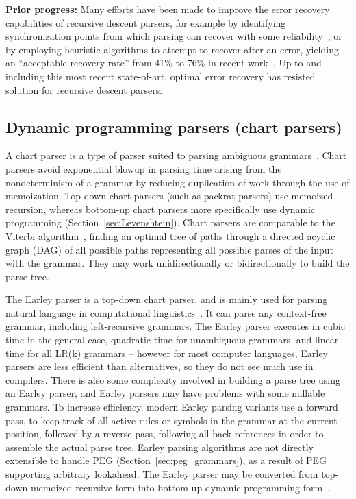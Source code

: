 \documentclass[manuscript,screen]{acmart}
\begin{document}
\begin{enumerate}
    {\bf Prior progress:} Many efforts have been made to improve the error recovery capabilities of recursive descent parsers, for example by identifying synchronization points from which parsing can recover with some reliability~\citep{medeiros2018}, or by employing heuristic algorithms to attempt to recover after an error, yielding an ``acceptable recovery rate'' from 41\% to 76\% in recent work~\citep{medeiros2020}. Up to and including this most recent state-of-art, optimal error recovery has resisted solution for recursive descent parsers.
\end{enumerate}

\subsection{\label{sec:RTL}Dynamic programming parsers (chart parsers)}

A chart parser is a type of parser suited to parsing ambiguous grammars~\citep{kay1980}. Chart parsers avoid exponential blowup in parsing time arising from the nondeterminism of a grammar by reducing duplication of work through the use of memoization. Top-down chart parsers (such as packrat parsers) use memoized recursion, whereas bottom-up chart parsers more specifically use dynamic programming (Section~\ref{sec:Levenshtein}). Chart parsers are comparable to the Viterbi algorithm~\citep{viterbi1967}, finding an optimal tree of paths through a directed acyclic graph (DAG) of all possible paths representing all possible parses of the input with the grammar. They may work unidirectionally or bidirectionally to build the parse tree.

The Earley parser is a top-down chart parser, and is mainly used for parsing natural language in computational linguistics~\citep{earley1970}. It can parse any context-free grammar, including left-recursive grammars. The Earley parser executes in cubic time in the general case, quadratic time for unambiguous grammars, and linear time for all LR(k) grammars -- however for most computer languages, Earley parsers are less efficient than alternatives, so they do not see much use in compilers. There is also some complexity involved in building a parse tree using an Earley parser, and Earley parsers may have problems with some nullable grammars. To increase efficiency, modern Earley parsing variants use a forward pass, to keep track of all active rules or symbols in the grammar at the current position, followed by a reverse pass, following all back-references in order to assemble the actual parse tree. Earley parsing algorithms are not directly extensible to handle PEG (Section~\ref{sec:peg_grammars}), as a result of PEG supporting arbitrary lookahead. The Earley parser may be converted from top-down memoized recursive form into bottom-up dynamic programming form~\citep{voisin1988}.
\end{document}
